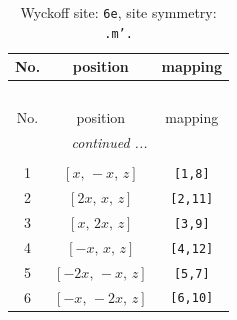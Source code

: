 \documentclass[fleqn,8pt]{jsarticle}
\begin{document}
\renewcommand{\arraystretch}{1.2}
\begin{longtable}{ccc}
\caption{Wyckoff site: {\tt 6e}, site symmetry: {\tt .m'.}}
 \\
 \hline \hline
No. & position & mapping \\ \hline \endfirsthead

\multicolumn{2}{l}{\tablename\ \thetable{}} \\
 \hline \hline
No. & position & mapping \\ \hline \endhead

 \hline \hline
\multicolumn{2}{r}{\footnotesize\it continued ...} \\ \endfoot

 \hline \hline
\multicolumn{2}{r}{} \\ \endlastfoot

1 & $\left[ x,\, - x,\, z \right]$ & {\tt [1,8]} \\ \hline
2 & $\left[ 2 x,\, x,\, z \right]$ & {\tt [2,11]} \\ \hline
3 & $\left[ x,\, 2 x,\, z \right]$ & {\tt [3,9]} \\ \hline
4 & $\left[ - x,\, x,\, z \right]$ & {\tt [4,12]} \\ \hline
5 & $\left[ - 2 x,\, - x,\, z \right]$ & {\tt [5,7]} \\ \hline
6 & $\left[ - x,\, - 2 x,\, z \right]$ & {\tt [6,10]} \\
\end{longtable}
\renewcommand{\arraystretch}{1.2}
\end{document}
